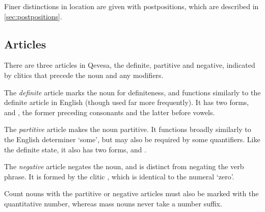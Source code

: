 \documentclass[grammar]{subfiles}
\begin{document}
  Finer distinctions in location are given with postpositions, which are
  described in \cref{sec:postpositions}.

  \subsection{Articles}
  \label{ssec:nm_articles}

  There are three articles in Qevesa, the definite, partitive and negative,
  indicated by clitics that precede the noun and any modifiers.  

  The \emph{definite} article marks the noun for definiteness, and functions
  similarly to the definite article in English (though used far more
  frequently).  It has two forms,  and , the former
  preceding consonants and the latter before vowels.  

  The \emph{partitive} article makes the noun partitive.  It functions broadly
  similarly to the English determiner ‘some’, but may also be required by some
  quantifiers.  Like the definite state, it also has two forms, 
  and .

  The \emph{negative} article negates the noun, and is distinct from negating the
  verb phrase.  It is formed by the clitic , which is identical to
  the numeral ‘zero’.  

  Count nouns with the partitive or negative articles must also be marked with
  the quantitative number, whereas mass nouns never take a number suffix.  

%
\end{document}
